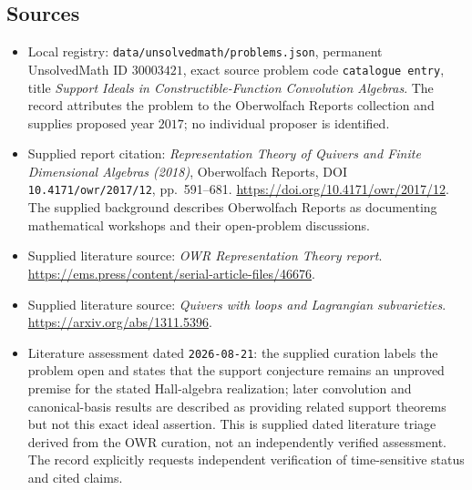 \documentclass[11pt]{article}
\begin{document}
\subsection{Sources}
\begin{itemize}
\item Local registry: \texttt{data/unsolvedmath/problems.json}, permanent UnsolvedMath ID \(30003421\), exact source problem code \texttt{catalogue entry}, title \emph{Support Ideals in Constructible-Function Convolution Algebras}. The record attributes the problem to the Oberwolfach Reports collection and supplies proposed year \(2017\); no individual proposer is identified.
\item Supplied report citation: \emph{Representation Theory of Quivers and Finite Dimensional Algebras (2018)}, Oberwolfach Reports, DOI \texttt{10.4171/owr/2017/12}, pp.\ 591--681. \url{https://doi.org/10.4171/owr/2017/12}. The supplied background describes Oberwolfach Reports as documenting mathematical workshops and their open-problem discussions.
\item Supplied literature source: \emph{OWR Representation Theory report}. \url{https://ems.press/content/serial-article-files/46676}.
\item Supplied literature source: \emph{Quivers with loops and Lagrangian subvarieties}. \url{https://arxiv.org/abs/1311.5396}.
\item Literature assessment dated \texttt{2026-08-21}: the supplied curation labels the problem open and states that the support conjecture remains an unproved premise for the stated Hall-algebra realization; later convolution and canonical-basis results are described as providing related support theorems but not this exact ideal assertion. This is supplied dated literature triage derived from the OWR curation, not an independently verified assessment. The record explicitly requests independent verification of time-sensitive status and cited claims.
\end{itemize}
\end{document}
